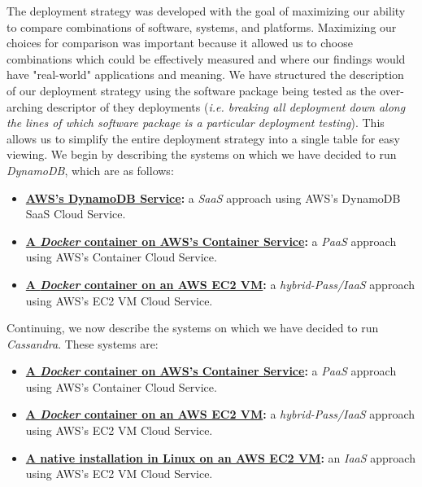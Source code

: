 The deployment strategy was developed with the goal of maximizing our ability to compare combinations of software, systems, and platforms.  Maximizing our choices for comparison was important because it allowed us to choose combinations which could be effectively measured and where our findings would have "real-world" applications and meaning.  We have structured the description of our deployment strategy using the software package being tested as the over-arching descriptor of they deployments (\emph{i.e. breaking all deployment down along the lines of which software package is a particular deployment testing}).  This allows us to simplify the entire deployment strategy into a single table for easy viewing. We begin by describing the systems on which we have decided to run \emph{DynamoDB}, which are as follows:

\begin{itemize}
	\item \textbf{\underline{AWS's DynamoDB Service}:} a \emph{SaaS} approach using AWS's DynamoDB SaaS Cloud Service.
	\item \textbf{\underline{A \emph{Docker} container on AWS's Container Service}:} a \emph{PaaS} approach using AWS's Container Cloud Service.
	\item \textbf{\underline{A \emph{Docker} container on an AWS EC2 VM}:} a \emph{hybrid-Pass/IaaS} approach using AWS's EC2 VM Cloud Service.
\end{itemize}


Continuing, we now describe the systems on which we have decided to run \emph{Cassandra}.  These systems are:

\begin{itemize}
	\item \textbf{\underline{A \emph{Docker} container on AWS's Container Service}:} a \emph{PaaS} approach using AWS's Container Cloud Service.
	\item \textbf{\underline{A \emph{Docker} container on an AWS EC2 VM}:} a \emph{hybrid-Pass/IaaS} approach using AWS's EC2 VM Cloud Service.
	\item \textbf{\underline{A native installation in Linux on an AWS EC2 VM}:} an \emph{IaaS} approach using AWS's EC2 VM Cloud Service.
\end{itemize}







